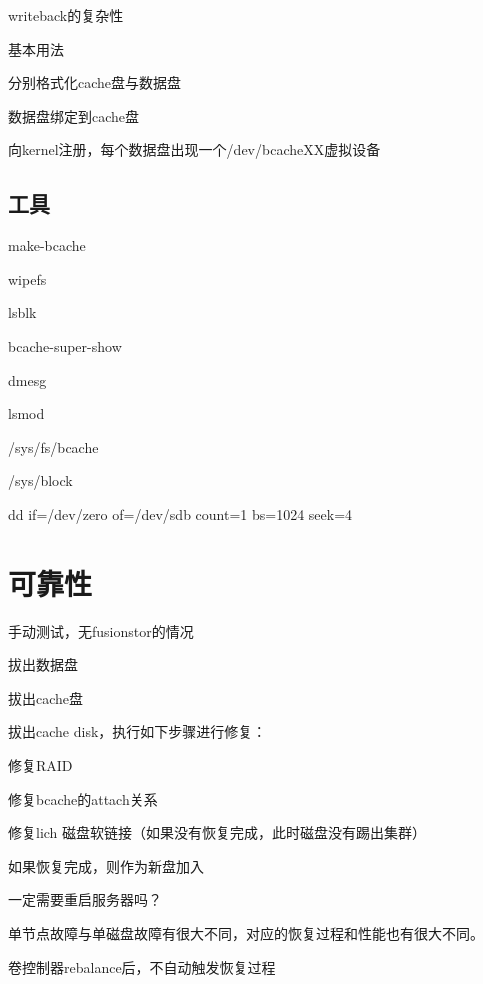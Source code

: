 writeback的复杂性

基本用法
\begin{enumbox}
\item 分别格式化cache盘与数据盘
\item 数据盘绑定到cache盘
\item 向kernel注册，每个数据盘出现一个/dev/bcacheXX虚拟设备
\end{enumbox}

\subsection{工具}

\begin{enumbox}
\item make-bcache
\item wipefs
\item lsblk
\item bcache-super-show
\item dmesg
\item lsmod
\item /sys/fs/bcache
\item /sys/block
\item dd if=/dev/zero of=/dev/sdb count=1 bs=1024 seek=4
\end{enumbox}

\section{可靠性}

手动测试，无fusionstor的情况
\begin{enumbox}
\item 拔出数据盘
\item 拔出cache盘
\end{enumbox}

拔出cache disk，执行如下步骤进行修复：
\begin{enumbox}
\item 修复RAID
\item 修复bcache的attach关系
\item 修复lich 磁盘软链接（如果没有恢复完成，此时磁盘没有踢出集群）
\item 如果恢复完成，则作为新盘加入
\end{enumbox}

一定需要重启服务器吗？

单节点故障与单磁盘故障有很大不同，对应的恢复过程和性能也有很大不同。

卷控制器rebalance后，不自动触发恢复过程

